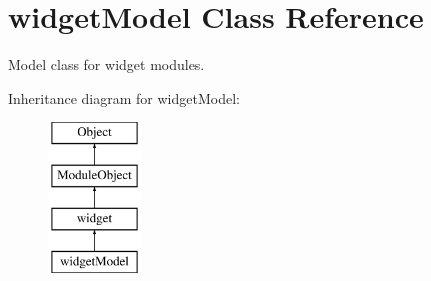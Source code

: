 \hypertarget{classwidgetModel}{}\section{widget\+Model Class Reference}
\label{classwidgetModel}


Model class for widget modules.  


Inheritance diagram for widget\+Model\+:\begin{figure}[H]
\begin{center}
\leavevmode
\includegraphics[height=4.000000cm]{classwidgetModel}
\end{center}
\end{figure}
